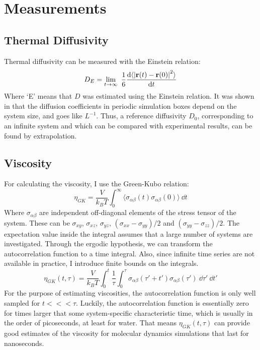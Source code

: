 \section{Measurements}

\subsection{Thermal Diffusivity}
Thermal diffusivity can be measured with the Einstein relation:
\begin{equation}
	D_E = \lim_{t\to\infty} \frac{1}{6} \frac{\dd \langle \left|\rvec(t) - \rvec(0)\right|^2\rangle}{\dd t}
	\label{eq:Einstein_diffusivity}
\end{equation}
Where `E' means that $D$ was estimated using the Einstein relation. It was shown in \cite{Yeh2004} that the diffusion coefficients in periodic simulation boxes depend on the system size, and goes like $L^{-1}$. Thus, a reference diffusivity $D_0$, corresponding to an infinite system and which can be compared with experimental results, can be found by extrapolation.

\subsection{Viscosity}
For calculating the viscosity, I use the Green-Kubo relation:
\begin{equation}
	\eta_{GK} = \frac{V}{k_B T} \int_0^\infty \langle \sigma_{\alpha\beta}(t) \sigma_{\alpha\beta}(0) \rangle\ \dd t
	\label{eq:GK_shear_viscosity}
\end{equation}
Where $\sigma_{\alpha\beta}$ are independent off-diagonal elements of the stress tensor of the system. These can be $\sigma_{xy}$, $\sigma_{xz}$, $\sigma_{yz}$, $(\sigma_{xx}-\sigma_{yy})/2$ and $(\sigma_{yy}-\sigma_{zz})/2$. The expectation value inside the integral assumes that a large number of systems are investigated. Through the ergodic hypothesis, we can transform the autocorrelation function to a time integral. Also, since infinite time series are not available in practice, I introduce finite bounds on the integrals. 
\begin{equation}
	\eta_{GK}(t, \tau) = \frac{V}{k_B T} \int_0^t  \frac{1}{\tau} \int_0^\tau \sigma_{\alpha\beta}(\tau'+t') \sigma_{\alpha\beta}(\tau')\ \dd \tau'\ \dd t' 
\label{eq:GK_shear_viscosity_estimate}
\end{equation}
For the purpose of estimating viscosities, the autocorrelation function is only well sampled for $t <<< \tau$. Luckily, the autocorrelation function is essentially zero for times larger that some system-specific characteristic time, which is usually in the order of picoseconds, at least for water. That means $\eta_{GK}(t, \tau)$ can provide good estimates of the viscosity for molecular dynamics simulations that last for nanoseconds.


